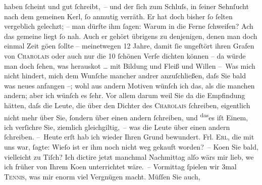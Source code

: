 \begin{ledgroupsized}[t]{13cm}
               haben ſcheint und gut ſchreibt, – und der ſich zum Schluſs, in ſeiner Sehnſucht {\pb}nach dem gemeinen Kerl, ſo anmutig verräth. Er hat
               doch bisher ſo ſelten vergeblich gelechzt; – man dürfte ihm ſagen: Warum in die Ferne
               ſchweifen? Ach das gemeine liegt ſo nah. Auch er gehört übrigens zu denjenigen, denen
               man doch einmal Zeit gö{\geminationn}en ſollte – meinetwegen 12
               Jahre, damit ſie ungeſtört ihren Grafen von \textsc{Charolais} oder auch nur die 10 ſchönen Verſe dichten können – da{\geminationn} würde man doch {\pb}ſehen,
               was herausko{\geminationm}t {\dots} mit Bildung
               und Fleiß und Willen {\dotsfour}\pend
           \pstart
           – Was mich nicht hindert, mich dem Wunſche mancher andrer anzuſchließen, daſs Sie
               bald was neues anfangen –; wohl aus andern Motiven wünſch ich das, als die manchen
               andern; aber ich wünſch es ſehr. Vor allem darum weil Sie da{\geminationn} die Empfindung hätten, daſs die Leute, die über den
               Dichter des \textsc{Charolais} ſchreiben, eigentlich nicht mehr über Sie, ſondern über {\pb}einen andern ſchreiben, und \substVorne{}\textsuperscript{das}\substDazwischen{}es\substHinten{} iſt Einem, ich
               verſichre Sie,  ziemlich gleichgiltig, – was die
               Leute über einen andern ſchreiben.\pend
           \pstart
           – Heute erſt hab ich wieder Ihren Grund bewundert. Frl. \textsc{Erl}, die mit uns war, ſagte: Wieſo ist er ihm noch nicht weg gekauft worden? –\pend
           \pstart
           Ko{\geminationm}en Sie bald, vielleicht zu Tiſch? Ich dictire jetzt
               manchmal Nachmittag alſo wärs mir lieb, we{\geminationn} ich früher
               von Ihrem Ko{\geminationm}en unterrichtet {\pb}wäre. – Vormittag ſpielen wir 3mal \textsc{Tennis}, was mir enorm viel Vergnügen macht. Müſſen Sie auch,

\end{ledgroupsized}
